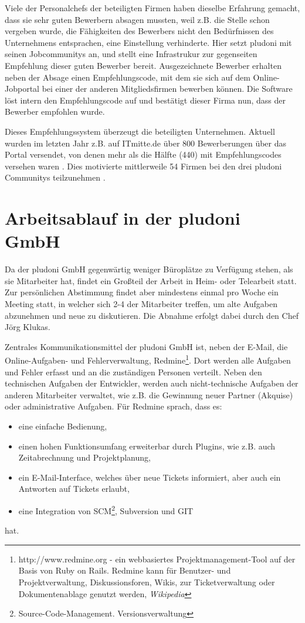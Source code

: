 Viele der Personalchefs der beteiligten Firmen haben dieselbe Erfahrung gemacht, dass sie sehr guten Bewerbern absagen mussten, weil z.B. die Stelle schon vergeben wurde, die Fähigkeiten des Bewerbers nicht den Bedürfnissen des Unternehmens entsprachen, eine Einstellung verhinderte. Hier setzt pludoni mit seinen Jobcommunitys an, und stellt eine Infrastrukur zur gegenseiten Empfehlung dieser guten Bewerber bereit.  Ausgezeichnete Bewerber erhalten neben der Absage einen Empfehlungscode, mit dem sie sich auf dem Online-Jobportal bei einer der anderen Mitgliedsfirmen bewerben können. Die Software löst intern den Empfehlungscode auf und bestätigt dieser Firma nun, dass der Bewerber empfohlen wurde. 

Dieses Empfehlungssystem überzeugt die beteiligten Unternehmen. Aktuell wurden im letzten Jahr z.B. auf ITmitte.de über 800 Bewerberungen über das Portal versendet, von denen mehr als die Hälfte (440) mit Empfehlungscodes versehen waren \citep{joerg_klukas_startseite_2011}. Dies motivierte mittlerweile 54 Firmen bei den drei pludoni Communitys teilzunehmen \citep{joerg_klukas_referenzen_2011}.

\section{Arbeitsablauf in der pludoni GmbH}

Da der pludoni GmbH gegenwärtig weniger Büroplätze zu Verfügung stehen, als sie Mitarbeiter hat, findet ein Großteil der Arbeit in Heim- oder Telearbeit statt.
Zur persönlichen Abstimmung findet aber mindestens einmal pro Woche ein Meeting statt, in welcher sich 2-4 der Mitarbeiter treffen, um alte Aufgaben abzunehmen und neue zu diskutieren. Die Abnahme erfolgt dabei durch den Chef Jörg Klukas.

Zentrales Kommunikationsmittel der pludoni GmbH ist, neben der E-Mail, die Online-Aufgaben- und Fehlerverwaltung, Redmine\footnote{http://www.redmine.org - ein webbasiertes Projektmanagement-Tool auf der Basis von Ruby on Rails. Redmine kann für Benutzer- und Projektverwaltung, Diskussionsforen, Wikis, zur Ticketverwaltung oder Dokumentenablage genutzt werden, \textit{Wikipedia}}. Dort werden alle Aufgaben und Fehler erfasst und an die zuständigen Personen verteilt. 
Neben den technischen Aufgaben der Entwickler, werden auch nicht-technische Aufgaben der anderen Mitarbeiter verwaltet, wie z.B. die Gewinnung neuer Partner (Akquise) oder administrative Aufgaben. Für Redmine sprach, dass es:
\begin{itemize}
\item  eine einfache Bedienung,
\item  einen hohen Funktionsumfang erweiterbar durch Plugins, wie z.B. auch Zeitabrechnung und Projektplanung,
\item  ein E-Mail-Interface, welches über neue Tickets informiert, aber auch ein Antworten auf Tickets erlaubt,
\item  eine Integration von SCM\footnote{Source-Code-Management. Versionsverwaltung}, Subversion und GIT \end{itemize}
hat.

